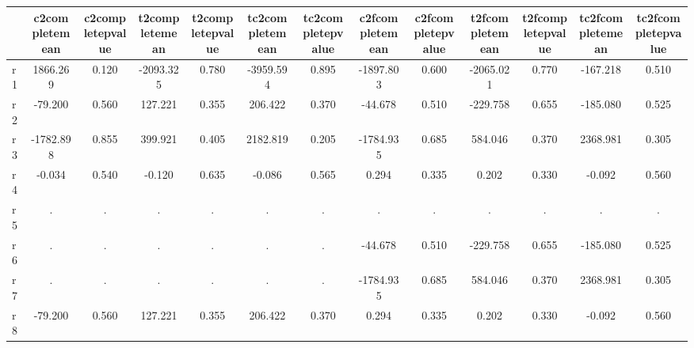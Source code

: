 \begin{table}[htbp]
\begin{tabular}{lcccccccccccc} \hline \hline
 & c2completemean  & c2completepvalue  & t2completemean  & t2completepvalue  & tc2completemean  & tc2completepvalue  & c2fcompletemean  & c2fcompletepvalue  & t2fcompletemean  & t2fcompletepvalue  & tc2fcompletemean  & tc2fcompletepvalue  \\  \hline 
r1 &  1866.269 &     0.120 & -2093.325 &     0.780 & -3959.594 &     0.895 & -1897.803 &     0.600 & -2065.021 &     0.770 &  -167.218 &     0.510 \\  
r2 &   -79.200 &     0.560 &   127.221 &     0.355 &   206.422 &     0.370 &   -44.678 &     0.510 &  -229.758 &     0.655 &  -185.080 &     0.525 \\  
r3 & -1782.898 &     0.855 &   399.921 &     0.405 &  2182.819 &     0.205 & -1784.935 &     0.685 &   584.046 &     0.370 &  2368.981 &     0.305 \\  
r4 &    -0.034 &     0.540 &    -0.120 &     0.635 &    -0.086 &     0.565 &     0.294 &     0.335 &     0.202 &     0.330 &    -0.092 &     0.560 \\  
r5 &         . &         . &         . &         . &         . &         . &         . &         . &         . &         . &         . &         . \\  
r6 &         . &         . &         . &         . &         . &         . &   -44.678 &     0.510 &  -229.758 &     0.655 &  -185.080 &     0.525 \\  
r7 &         . &         . &         . &         . &         . &         . & -1784.935 &     0.685 &   584.046 &     0.370 &  2368.981 &     0.305 \\  
r8 &   -79.200 &     0.560 &   127.221 &     0.355 &   206.422 &     0.370 &     0.294 &     0.335 &     0.202 &     0.330 &    -0.092 &     0.560 \\  
\hline \hline \end{tabular}
\end{table}
